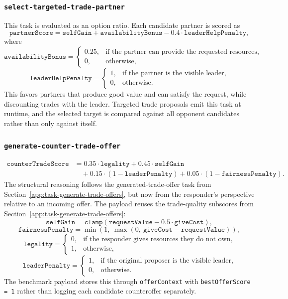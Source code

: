 \documentclass[letter,  12 pt]{article}
\begin{document}
\subsubsection{\texttt{select-targeted-trade-partner}}
\label{app:task-select-targeted-trade-partner}
This task is evaluated as an option ratio.
Each candidate partner is scored as
\[
\texttt{partnerScore}
= \texttt{selfGain} + \texttt{availabilityBonus}
- 0.4 \cdot \texttt{leaderHelpPenalty},
\]
where
\[
\texttt{availabilityBonus} =
\begin{cases}
0.25, & \text{if the partner can provide the requested resources},\\
0, & \text{otherwise},
\end{cases}
\]
\[
\texttt{leaderHelpPenalty} =
\begin{cases}
1, & \text{if the partner is the visible leader},\\
0, & \text{otherwise}.
\end{cases}
\]
This favors partners that produce good value and can satisfy the request, while discounting trades with the leader.
Targeted trade proposals emit this task at runtime, and the selected target is compared against all opponent candidates rather than only against itself.

\subsubsection{\texttt{generate-counter-trade-offer}}
\label{app:task-generate-counter-trade-offer}
\[
\begin{aligned}
\texttt{counterTradeScore}
&= 0.35 \cdot \texttt{legality}
+ 0.45 \cdot \texttt{selfGain} \\
&\quad + 0.15 \cdot (1 - \texttt{leaderPenalty})
+ 0.05 \cdot (1 - \texttt{fairnessPenalty}).
\end{aligned}
\]
The structural reasoning follows the generated-trade-offer task from Section~\ref{app:task-generate-trade-offers}, but now from the responder's perspective relative to an incoming offer.
The payload reuses the trade-quality subscores from Section~\ref{app:task-generate-trade-offers}:
\[
\texttt{selfGain} = \texttt{clamp}(\texttt{requestValue} - 0.5 \cdot \texttt{giveCost}),
\]
\[
\texttt{fairnessPenalty}
= \min(1,\ \max(0,\ \texttt{giveCost} - \texttt{requestValue})),
\]
\[
\texttt{legality} =
\begin{cases}
0, & \text{if the responder gives resources they do not own},\\
1, & \text{otherwise},
\end{cases}
\]
\[
\texttt{leaderPenalty} =
\begin{cases}
1, & \text{if the original proposer is the visible leader},\\
0, & \text{otherwise}.
\end{cases}
\]
The benchmark payload stores this through \texttt{offerContext} with \texttt{bestOfferScore = 1} rather than logging each candidate counteroffer separately.
\end{document}
